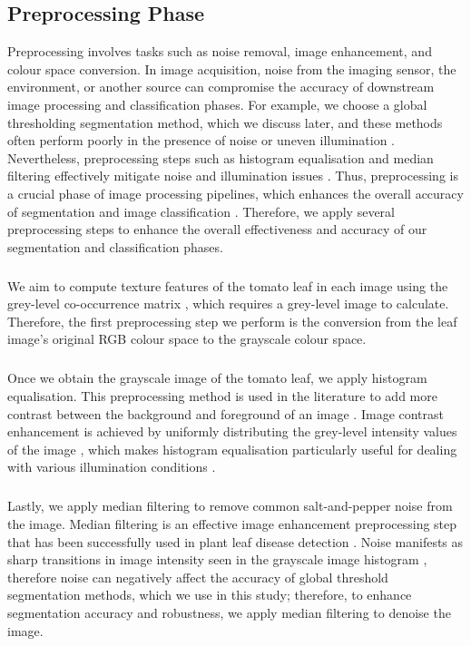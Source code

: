 \subsection{Preprocessing Phase}
Preprocessing involves tasks such as noise removal, image enhancement, and colour space conversion. In image acquisition, noise from the imaging sensor, the environment, or another source can compromise the accuracy of downstream image processing and classification phases. For example, we choose a global thresholding segmentation method, which we discuss later, and these methods often perform poorly in the presence of noise or uneven illumination \cite{gonzalezDigitalImageProcessing2017}. Nevertheless, preprocessing steps such as histogram equalisation and median filtering effectively mitigate noise and illumination issues \cite{gonzalezDigitalImageProcessing2017, saiImageQualityEnhancement2023, thangaduraiComputerVisionimageEnhancement2014}. Thus, preprocessing is a crucial phase of image processing pipelines, which enhances the overall accuracy of segmentation and image classification  \cite{kiranPlantLeafDisease2023, parkImagePreProcessingMethod2021}. Therefore, we apply several preprocessing steps to enhance the overall effectiveness and accuracy of our segmentation and classification phases.

\subparagraph{}
We aim to compute texture features of the tomato leaf in each image using the grey-level co-occurrence matrix \cite{haralickTexturalFeaturesImage1973}, which requires a grey-level image to calculate. Therefore, the first preprocessing step we perform is the conversion from the leaf image's original RGB colour space to the grayscale colour space. 

\subparagraph{}
Once we obtain the grayscale image of the tomato leaf, we apply histogram equalisation. This preprocessing method is used in the literature to add more contrast between the background and foreground of an image \cite{saiImageQualityEnhancement2023}. Image contrast enhancement is achieved by uniformly distributing the grey-level intensity values of the image \cite{gonzalezDigitalImageProcessing2017}, which makes histogram equalisation particularly useful for dealing with various illumination conditions \cite{kiranPlantLeafDisease2023}. 

\subparagraph{}
Lastly, we apply median filtering to remove common salt-and-pepper noise from the image. Median filtering is an effective image enhancement preprocessing step that has been successfully used in plant leaf disease detection \cite{hamudaSurveyImageProcessing2016a, desaiEnhancingImageQuality2025}. Noise manifests as sharp transitions in image intensity seen in the grayscale image histogram \cite{gonzalezDigitalImageProcessing2017}, therefore noise can negatively affect the accuracy of global threshold segmentation methods, which we use in this study; therefore, to  enhance segmentation accuracy and robustness, we apply median filtering to denoise the image.


